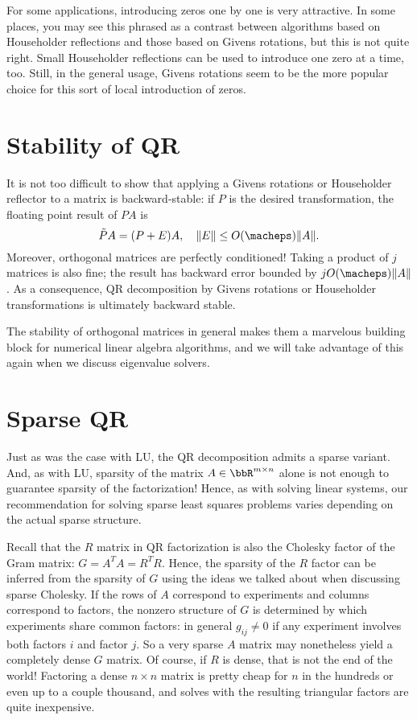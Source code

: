 \documentclass[12pt, leqno]{article} %
\begin{document}
For some applications, introducing zeros one by one is very
attractive.  In some places, you may see this phrased as a contrast
between algorithms based on Householder reflections and those based on
Givens rotations, but this is not quite right.  Small Householder
reflections can be used to introduce one zero at a time, too.
Still, in the general usage, Givens rotations seem to be the more
popular choice for this sort of local introduction of zeros.

\section{Stability of QR}

It is not too difficult to show that applying a Givens rotations or
Householder reflector to a matrix is backward-stable: if $P$ is the
desired transformation, the floating point result of $PA$ is
\[
  \tilde{P} A = (P+E) A, \quad \|E\| \leq O(\macheps) \|A\|.
\]
Moreover, orthogonal matrices are perfectly conditioned!
Taking a product of $j$ matrices is also fine; the result
has backward error bounded by $j O(\macheps) \|A\|$.
As a consequence, QR decomposition by Givens rotations or Householder
transformations is ultimately backward stable.

The stability of orthogonal matrices in general makes them a
marvelous building block for numerical linear algebra algorithms,
and we will take advantage of this again when we discuss
eigenvalue solvers.

\section{Sparse QR}

Just as was the case with LU, the QR decomposition admits a sparse
variant.  And, as with LU, sparsity of the
matrix $A \in \bbR^{m \times n}$ alone is not
enough to guarantee sparsity of the factorization!  Hence, as with
solving linear systems, our recommendation for solving sparse least
squares problems varies depending on the actual sparse structure.

Recall that the $R$ matrix in QR factorization is also the Cholesky
factor of the Gram matrix: $G = A^T A = R^T R$.  Hence, the sparsity of
the $R$ factor can be inferred from the sparsity of $G$ using the ideas
we talked about when discussing sparse Cholesky.  If the rows of $A$
correspond to experiments and columns correspond to factors, the nonzero
structure of $G$ is determined by which experiments share common
factors: in general $g_{ij} \neq 0$ if any experiment involves both
factors $i$ and factor $j$. So a very sparse $A$ matrix may nonetheless
yield a completely dense $G$ matrix. Of course, if $R$ is dense, that is
not the end of the world!  Factoring a dense $n \times n$ matrix is
pretty cheap for $n$ in the hundreds or even up to a couple thousand,
and solves with the resulting triangular factors are quite inexpensive.
\end{document}
